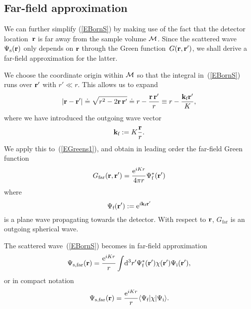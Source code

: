 
\subsection{Far-field approximation}


We can further simplify (\ref{EBornS})
by making use of the fact that the detector location~$\mathbf{r}$
is far away from the sample volume $\mathcal{M}$.
Since the scattered wave $\Psi_\text{s}(\mathbf{r})$
only depends on $\mathbf{r}$ through the Green function~$G(\mathbf{r},\mathbf{r}')$,
we shall derive a far-field approximation for the latter.

We choose the coordinate origin within $\mathcal{M}$
so that the integral in~(\ref{EBornS}) runs over $\mathbf{r}'$ with $r'\ll r$.
This allows us to expand
\begin{equation}
  \left|\mathbf{r}-\mathbf{r}'\right|
  \doteq \sqrt{r^2-2\mathbf{r}\,\mathbf{r}'}
  \doteq r - \frac{\mathbf{r}\,\mathbf{r}'}{r}
  \equiv r - \frac{\mathbf{k}_\text{f} \mathbf{r}'}{K},
\end{equation}
where we have introduced the outgoing wave vector
\begin{equation}
  \mathbf{k}_\text{f}:=K\frac{\mathbf{r}}{r}.
\end{equation}
We apply this to~(\ref{EGreens1}),
and obtain in leading order the far-field Green function
\begin{equation}\label{EGreenFar}
  G_\text{far}(\mathbf{r},\mathbf{r}')
  =\frac{{\rm e}^{iKr}}{4\pi r}\Psi^*_\text{f}(\mathbf{r}')
  \end{equation}
where
\begin{equation}
  \Psi_\text{f}(\mathbf{r}') := {\rm e}^{i\mathbf{k}_\text{f} \mathbf{r}'}
\end{equation}
is a plane wave propagating towards the detector.
With respect to $\mathbf{r}$, $G_\text{far}$ is an outgoing spherical wave.

The scattered wave~(\ref{EBornS})
becomes in far-field approximation 
\begin{equation}\label{Esandwich}
  \Psi_\text{s,far}(\mathbf{r})
  = \frac{{\rm e}^{iKr}}{r}
    \int\!{\rm d}^3r'
    \Psi^*_\text{f}(\mathbf{r}')\chi(\mathbf{r}')\Psi_\text{i}(\mathbf{r}'),
\end{equation}
or in compact notation
\begin{equation}\label{EsandwichC}
  \Psi_\text{s,far}(\mathbf{r})
  = \frac{{\rm e}^{iKr}}{r}
    \langle \Psi_\text{f}|\chi|\Psi_\text{i}\rangle.
\end{equation}

